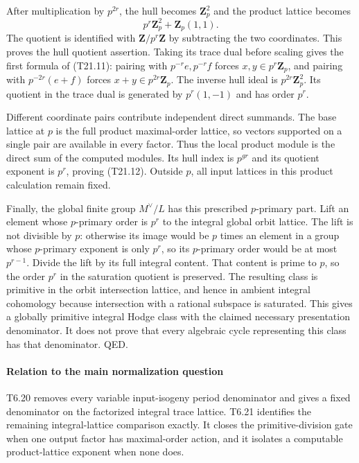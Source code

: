 After multiplication by \(p^{2r}\), the hull becomes \(\mathbf Z_p^2\) and the product lattice becomes \[
 p^r\mathbf Z_p^2+\mathbf Z_p(1,1).
\] The quotient is identified with \(\mathbf Z/p^r\mathbf Z\) by subtracting the two coordinates. This proves the hull quotient assertion. Taking its trace dual before scaling gives the first formula of (T21.11): pairing with \(p^{-r}e,p^{-r}f\) forces \(x,y\in p^r\mathbf Z_p\), and pairing with \(p^{-2r}(e+f)\) forces \(x+y\in p^{2r}\mathbf Z_p\). The inverse hull ideal is \(p^{2r}\mathbf Z_p^2\). Its quotient in the trace dual is generated by \(p^r(1,-1)\) and has order \(p^r\).

Different coordinate pairs contribute independent direct summands. The base lattice at \(p\) is the full product maximal-order lattice, so vectors supported on a single pair are available in every factor. Thus the local product module is the direct sum of the computed modules. Its hull index is \(p^{gr}\) and its quotient exponent is \(p^r\), proving (T21.12). Outside \(p\), all input lattices in this product calculation remain fixed.

Finally, the global finite group \(M^\vee/L\) has this prescribed \(p\)-primary part. Lift an element whose \(p\)-primary order is \(p^r\) to the integral global orbit lattice. The lift is not divisible by \(p\): otherwise its image would be \(p\) times an element in a group whose \(p\)-primary exponent is only \(p^r\), so its \(p\)-primary order would be at most \(p^{r-1}\). Divide the lift by its full integral content. That content is prime to \(p\), so the order \(p^r\) in the saturation quotient is preserved. The resulting class is primitive in the orbit intersection lattice, and hence in ambient integral cohomology because intersection with a rational subspace is saturated. This gives a globally primitive integral Hodge class with the claimed necessary presentation denominator. It does not prove that every algebraic cycle representing this class has that denominator. QED.

\paragraph{Relation to the main normalization question}\label{relation-to-the-main-normalization-question}

T6.20 removes every variable input-isogeny period denominator and gives a fixed denominator on the factorized integral trace lattice. T6.21 identifies the remaining integral-lattice comparison exactly. It closes the primitive-division gate when one output factor has maximal-order action, and it isolates a computable product-lattice exponent when none does.

